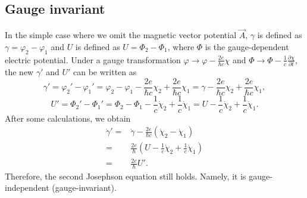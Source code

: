 \subsection{Gauge invariant}

In the simple case where we omit the magnetic vector potential $\overrightarrow{A}$,
$\gamma$ is defined as $\gamma=\varphi_{2}-\varphi_{1}$ and $U$
is defined as $U=\Phi_{2}-\Phi_{1}$, where $\Phi$ is the gauge-dependent
electric potential. Under a gauge transformation $\varphi\to\varphi-\frac{2e}{\hbar c}\chi$
and $\Phi\to\Phi-\frac{1}{c}\frac{\partial\chi}{\partial t}$, the
new $\gamma'$ and $U'$ can be written as
\begin{equation}
\gamma'=\varphi_{2}'-\varphi_{1}'=\varphi_{2}-\varphi_{1}-\frac{2e}{\hbar c}\chi_{2}+\frac{2e}{\hbar c}\chi_{1}=\gamma-\frac{2e}{\hbar c}\chi_{2}+\frac{2e}{\hbar c}\chi_{1},
\end{equation}
\begin{equation}
U'=\Phi_{2}'-\Phi_{1}'=\Phi_{2}-\Phi_{1}-\frac{1}{c}\dot{\chi}_{2}+\frac{1}{c}\dot{\chi}_{1}=U-\frac{1}{c}\dot{\chi}_{2}+\frac{1}{c}\dot{\chi}_{1}.
\end{equation}
After some calculations, we obtain
\begin{equation}
\begin{split}\dot{\gamma}'= & \dot{\gamma}-\frac{2e}{\hbar c}(\dot{\chi}_{2}-\dot{\chi}_{1})\\
= & \frac{2e}{\hbar}(U-\frac{1}{c}\dot{\chi}_{2}+\frac{1}{c}\dot{\chi}_{1})\\
= & \frac{2e}{\hbar}U'.
\end{split}
\end{equation}
Therefore, the second Josephson equation still holds. Namely, it is gauge-independent (gauge-invariant). 

